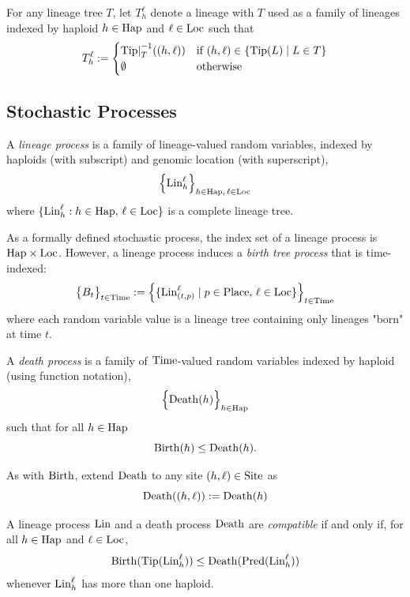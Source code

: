 \begin{defin}
For any lineage tree $T$,
let $T_h^\ell$ denote a lineage with $T$ used as a family of lineages
indexed by haploid $h \in \mathrm{Hap}$ and $\ell \in \mathrm{Loc}$ such that
\[
  T_h^\ell := \begin{cases}
    {\mathrm{Tip}|}_T^{-1}((h,\ell)) & \text{if $(h,\ell) \in \{ \mathrm{Tip}(L) \mid L \in T \}$} \\
    \emptyset & \text{otherwise}
  \end{cases}
\]
\end{defin}


\subsection{Stochastic Processes}

\begin{defin}
A \emph{lineage process} is a family of lineage-valued random variables,
  indexed by haploids (with subscript) and genomic location (with superscript),
\[
  \Big\{ \mathrm{Lin}_h^\ell \Big\}_{h \in \mathrm{Hap}, \, \ell \in \mathrm{Loc}}
\]
where $\{ \mathrm{Lin}_h^\ell : h \in \mathrm{Hap}, \, \ell \in \mathrm{Loc} \}$
 is a complete lineage tree.
\end{defin}

As a formally defined stochastic process, the index set of a lineage process is
$\mathrm{Hap} \times \mathrm{Loc}$. However, a lineage process induces a \emph{birth tree process} that
is time-indexed:
\[
  \big\{ B_t  \big\}_{t \in \mathrm{Time}} :=
  \left\{
    \{ \mathrm{Lin}_{(t, p)}^\ell \mid p \in \mathrm{Place}, \, \ell \in \mathrm{Loc} \}
  \right\}_{t \in \mathrm{Time}}
\]
where each random variable value is a lineage tree containing only lineages "born" at
time $t$.

\begin{defin}
A \emph{death process} is a family of $\mathrm{Time}$-valued random
  variables indexed by haploid (using function notation),
\[
  \Big\{ \mathrm{Death}(h) \Big\}_{h \in \mathrm{Hap}}
\]
such that for all $h \in \mathrm{Hap}$
\[
  \mathrm{Birth}(h) \le \mathrm{Death}(h)
  \text{.}
\]
\end{defin}

As with $\mathrm{Birth}$, extend $\mathrm{Death}$ to any site $(h,\ell) \in \mathrm{Site}$ as
\[
  \mathrm{Death}((h,\ell)) := \mathrm{Death}(h)
\]

\begin{defin}
A lineage process $\mathrm{Lin}$ and a death process $\mathrm{Death}$ are
  \emph{compatible} if and only if,
for all $h \in \mathrm{Hap}$ and $\ell \in \mathrm{Loc}$,
\[
  \mathrm{Birth}(\mathrm{Tip}(\mathrm{Lin}_h^\ell)) \le \mathrm{Death}(\mathrm{Pred}(\mathrm{Lin}_h^\ell))
\]
whenever $\mathrm{Lin}_h^\ell$ has more than one haploid.
\end{defin}

